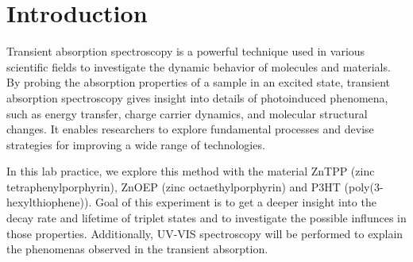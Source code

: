 
\chapter{Introduction}
\label{chap:intro}

Transient absorption spectroscopy is a powerful technique used in various scientific fields to investigate the dynamic behavior of molecules and materials. By probing the absorption properties of a sample in an excited state, transient absorption spectroscopy gives insight into details of photoinduced phenomena, such as energy transfer, charge carrier dynamics, and molecular structural changes. It enables researchers to explore fundamental processes and devise strategies for improving a wide range of technologies.
\bigskip

In this lab practice, we explore this method with the material ZnTPP (zinc tetraphenylporphyrin), ZnOEP (zinc octaethylporphyrin) and P3HT (poly(3-hexylthiophene)). Goal of this experiment is to get a deeper insight into the decay rate and lifetime of triplet states and to investigate the possible influnces in those properties. Additionally, UV-VIS spectroscopy will be performed to explain the phenomenas observed in the transient absorption.
